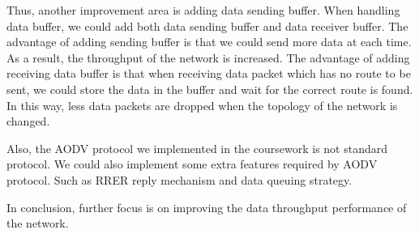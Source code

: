 Thus, another improvement area is adding data sending buffer. When handling data buffer, we could add both data sending buffer and data receiver buffer. The advantage of adding sending buffer is that we could send more data at each time. As a result, the throughput of the network is increased. The advantage of adding receiving data buffer is that when receiving data packet which has no route to be sent, we could store the data in the buffer and wait for the correct route is found. In this way, less data packets are dropped when the topology of the network is changed.

Also, the AODV protocol we implemented in the coursework is not standard protocol. We could also implement some extra features required by AODV protocol. Such as RRER reply mechanism and data queuing strategy.

In conclusion, further focus is on improving the data throughput performance of the network.







